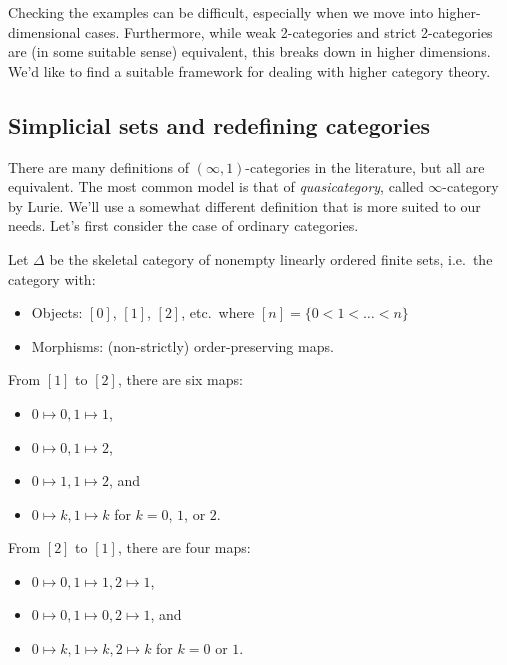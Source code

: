 Checking the examples can be difficult, especially when we move into higher-dimensional cases.
Furthermore, while weak 2-categories and strict 2-categories are (in some suitable sense) equivalent, this breaks down in higher dimensions.
We'd like to find a suitable framework for dealing with higher category theory.

\subsection{Simplicial sets and redefining categories}

There are many definitions of $(\infty, 1)$-categories in the literature, but all are equivalent.
The most common model is that of \emph{quasicategory}, called $\infty$-category by Lurie.
We'll use a somewhat different definition that is more suited to our needs.
Let's first consider the case of ordinary categories.

Let $\Delta$ be the skeletal category of nonempty linearly ordered finite sets, i.e.\ the category with:
\begin{itemize}
	\item Objects: $[0]$, $[1]$, $[2]$, etc.\ where $[n] = \{ 0 < 1 < \dots < n \}$
	\item Morphisms: (non-strictly) order-preserving maps.
\end{itemize}

\begin{ex}
	From $[1]$ to $[2]$, there are six maps:
	\begin{itemize}
		\item $0 \mapsto 0, 1 \mapsto 1$,
		\item $0 \mapsto 0, 1 \mapsto 2$,
		\item $0 \mapsto 1, 1 \mapsto 2$, and
		\item $0 \mapsto k, 1 \mapsto k$ for $k = 0$, $1$, or $2$.
	\end{itemize}
\end{ex}

\begin{ex}
	From $[2]$ to $[1]$, there are four maps:
	\begin{itemize}
		\item $0 \mapsto 0, 1 \mapsto 1, 2 \mapsto 1$,
		\item $0 \mapsto 0, 1 \mapsto 0, 2 \mapsto 1$, and
		\item $0 \mapsto k, 1 \mapsto k, 2 \mapsto k$ for $k = 0$ or $1$.
	\end{itemize}
\end{ex}

